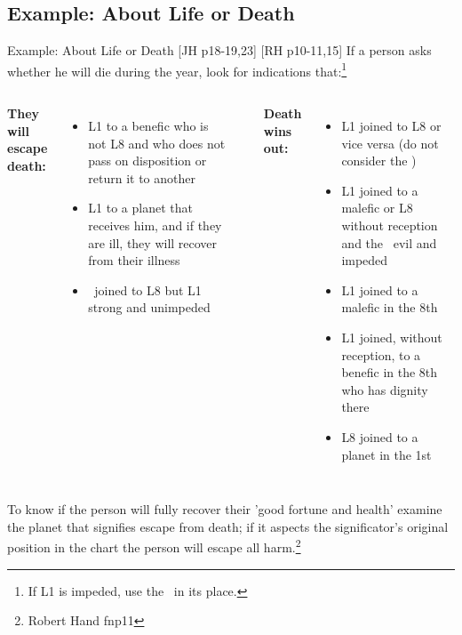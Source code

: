 \subsection{Example: About Life or Death}
\begin{frame}[t]{Example: About Life or Death [JH p18-19,23] [RH p10-11,15]}
If a person asks whether he will die during the year, look for indications that:\footnote{If L1 is impeded, use the \Moon\ in its place.}
\vspace{0.25cm}
\begin{columns}[T, onlytextwidth]
\textbf{They will escape death:}\\
\begin{itemize}
\item L1 to a benefic who is not L8 and who does not pass on disposition or return it to another 
\vspace{0.25cm}

\item L1 to a planet that receives him, and if they are ill, they will recover from their illness
\vspace{0.25cm}

\item \Moon\ joined to L8 but L1 strong and unimpeded
\end{itemize}

\rule{.1mm}{.35\textheight}

\textbf{Death wins out:}\\
\begin{itemize}
\item L1 joined to L8 or vice versa (do not consider the \Moon) 
\item L1 joined to a malefic or L8 without reception and the \Moon\ evil and impeded
\item L1 joined to a malefic in the 8th
\item L1 joined, without reception, to a benefic in the 8th who has dignity there
\item L8 joined to a planet in the 1st
\end{itemize}
\end{columns}
\vspace{0.25cm}
To know if the person will fully recover their  'good fortune and health' examine the planet that signifies escape from death; if it aspects the significator's original position in the chart the person will escape all harm.\footnote{Robert Hand fnp11}
\end{frame}